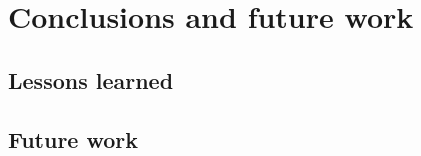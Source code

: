 
\chapter{Conclusions and future work}
\label{ch:conclusions}




\section{Lessons learned}
\label{se:conclusions}


\section{Future work}
\label{se:futurework}

